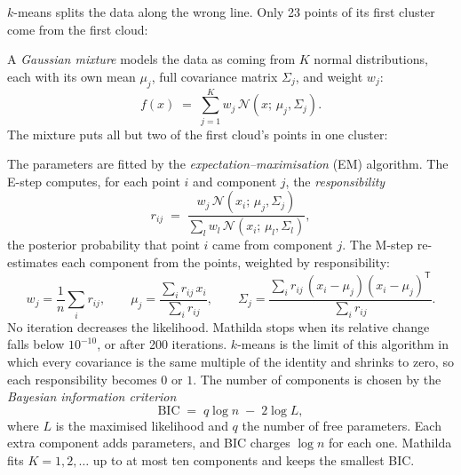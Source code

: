 \(k\)-means splits the data along the wrong line. Only 23 points of its first
cluster come from the first cloud:


A \emph{Gaussian mixture} models the data as coming from
\(K\) normal distributions, each with its own mean \(\mu_j\), full covariance
matrix \(\Sigma_j\), and weight \(w_j\):
\[
  f(x) \;=\; \sum_{j=1}^{K} w_j\, \mathcal{N}(x;\, \mu_j, \Sigma_j).
\]
The mixture puts all but two of the first cloud's points in one cluster:


The parameters are fitted by the \emph{expectation--maximisation}
(EM) algorithm. The E-step computes, for each
point \(i\) and component \(j\), the \emph{responsibility}
\[
  r_{ij} \;=\; \frac{w_j\, \mathcal{N}(x_i;\, \mu_j, \Sigma_j)}
                   {\sum_{l} w_l\, \mathcal{N}(x_i;\, \mu_l, \Sigma_l)} ,
\]
the posterior probability that point \(i\) came from component \(j\). The M-step
re-estimates each component from the points, weighted by responsibility:
\[
  w_j = \frac{1}{n}\sum_i r_{ij}, \qquad
  \mu_j = \frac{\sum_i r_{ij}\, x_i}{\sum_i r_{ij}}, \qquad
  \Sigma_j = \frac{\sum_i r_{ij}\,(x_i - \mu_j)(x_i-\mu_j)^{\mathsf T}}{\sum_i r_{ij}} .
\]
No iteration decreases the likelihood. Mathilda stops when its relative change
falls below \(10^{-10}\), or after 200 iterations. \(k\)-means is the limit of this algorithm in which every
covariance is the same multiple of the identity and shrinks to zero, so each
responsibility becomes \(0\) or \(1\). The number of components is chosen by the
\emph{Bayesian information criterion}
\[
  \mathrm{BIC} \;=\; q \log n \;-\; 2\log L,
\]
where \(L\) is the maximised likelihood and \(q\) the number of free parameters.
Each extra component adds parameters, and BIC charges \(\log n\) for each one.
Mathilda fits \(K = 1, 2, \dots\) up to at most ten components and keeps the
smallest BIC.


